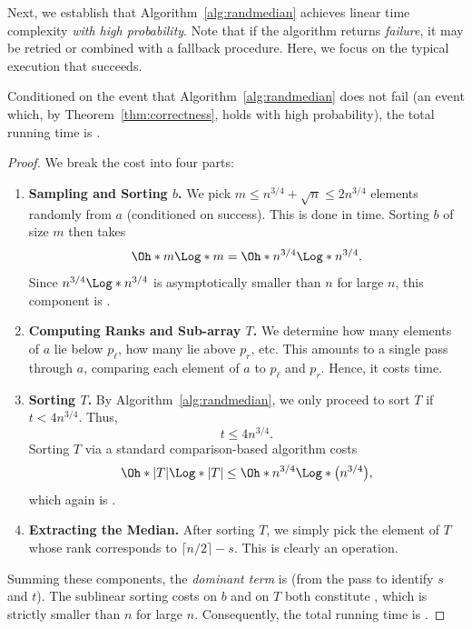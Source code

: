 Next, we establish that Algorithm~\ref{alg:randmedian} achieves linear time complexity \emph{with high probability}. Note that if the algorithm returns \emph{failure}, it may be retried or combined with a fallback procedure. Here, we focus on the typical execution that succeeds.

\begin{theorem}[Runtime]
\label{thm:runningtime}
Conditioned on the event that Algorithm~\ref{alg:randmedian} does not fail (an event which, by Theorem~\ref{thm:correctness}, holds with high probability), the total running time is .
\end{theorem}

\begin{proof}
We break the cost into four parts:
\begin{enumerate}
    \item \textbf{Sampling and Sorting \(b\).}
    We pick \(m \le n^{3/4} + \sqrt{n} \le 2 n^{3/4}\) elements randomly from \(a\) (conditioned on success). This is done in  time. Sorting \(b\) of size \(m\) then takes
    \[
    \Oh*{m \Log*{m}} 
    =
    \Oh*{n^{3/4} \Log*{n^{3/4}}}.
    \]
    Since \(n^{3/4} \Log*{n^{3/4}}\) is asymptotically smaller than \(n\) for large \(n\), this component is .

    \item \textbf{Computing Ranks and Sub-array \(T\).}
    We determine how many elements of \(a\) lie below \(p_\ell\), how many lie above \(p_r\), etc. This amounts to a single pass through \(a\), comparing each element of \(a\) to \(p_\ell\) and \(p_r\). Hence, it costs  time.

    \item \textbf{Sorting \(T\).}
    By Algorithm~\ref{alg:randmedian}, we only proceed to sort \(T\) if \(t < 4n^{3/4}\). Thus,
    \[
    t \le 4n^{3/4}.
    \]
    Sorting \(T\) via a standard comparison-based algorithm costs
    \[
    \Oh*{|T|\Log*{|T}|}
    \le
    \Oh*{n^{3/4} \Log*{\bigl(n^{3/4}\bigr)}},
    \]
    which again is .

    \item \textbf{Extracting the Median.}
    After sorting \(T\), we simply pick the element of \(T\) whose rank corresponds to \(\lceil n/2\rceil - s\). This is clearly an  operation.
\end{enumerate}

Summing these components, the \emph{dominant term} is  (from the pass to identify \(s\) and \(t\)). The sublinear sorting costs on \(b\) and on \(T\) both constitute , which is strictly smaller than \(n\) for large \(n\). Consequently, the total running time is .
\end{proof}

